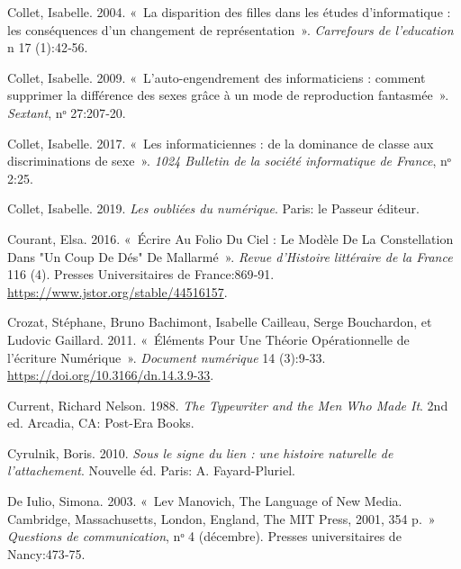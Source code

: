 \begin{CSLReferences}{1}{0}
\leavevmode{}%
Collet, Isabelle. 2004. {«~{La disparition des filles dans les {é}tudes
d'informatique : les cons{é}quences d'un changement de
repr{é}sentation}~»}. \emph{Carrefours de l'education} n{\textdegree} 17
(1):42‑56.

\leavevmode{}%
Collet, Isabelle. 2009. {«~{L'auto-engendrement des informaticiens :
comment supprimer la diff{é}rence des sexes gr{â}ce {à} un mode de
reproduction fantasm{é}e}~»}. \emph{Sextant}, nᵒ 27:207‑20.

\leavevmode{}%
Collet, Isabelle. 2017. {«~{Les informaticiennes : de la dominance de
classe aux discriminations de sexe}~»}. \emph{1024 {\textendash}
Bulletin de la soci{é}t{é} informatique de France}, nᵒ 2:25.

\leavevmode{}%
Collet, Isabelle. 2019. \emph{{Les oubli{é}es du num{é}rique}}. {Paris}:
{le Passeur {é}diteur}.

\leavevmode{}%
Courant, Elsa. 2016. {«~{É}crire {Au} {\guillemotleft} {Folio Du Ciel}
{\guillemotright} : {Le Mod{è}le De La Constellation Dans} "{Un Coup De
D{é}s}" {De Mallarm{é}}~»}. \emph{Revue d'Histoire litt{é}raire de la
France} 116 (4). {Presses Universitaires de France}:869‑91.
\url{https://www.jstor.org/stable/44516157}.

\leavevmode{}%
Crozat, Stéphane, Bruno Bachimont, Isabelle Cailleau, Serge Bouchardon,
et Ludovic Gaillard. 2011. {«~{É}l{é}ments Pour Une Th{é}orie
Op{é}rationnelle de l'{é}criture Num{é}rique~»}. \emph{Document
num{é}rique} 14 (3):9‑33. \url{https://doi.org/10.3166/dn.14.3.9-33}.

\leavevmode{}%
Current, Richard Nelson. 1988. \emph{The {Typewriter} and the {Men Who
Made} It}. 2nd ed. {Arcadia, CA}: {Post-Era Books}.

\leavevmode{}%
Cyrulnik, Boris. 2010. \emph{{Sous le signe du lien : une histoire
naturelle de l'attachement}}. Nouvelle {é}d. {Paris}: {A.
Fayard-Pluriel}.

\leavevmode{}%
De Iulio, Simona. 2003. {«~{Lev Manovich, The Language of New Media.
Cambridge, Massachusetts, London, England, The MIT Press, 2001, 354
p.}~»} \emph{Questions de communication}, nᵒ 4 (décembre). {Presses
universitaires de Nancy}:473‑75.


\end{CSLReferences}
